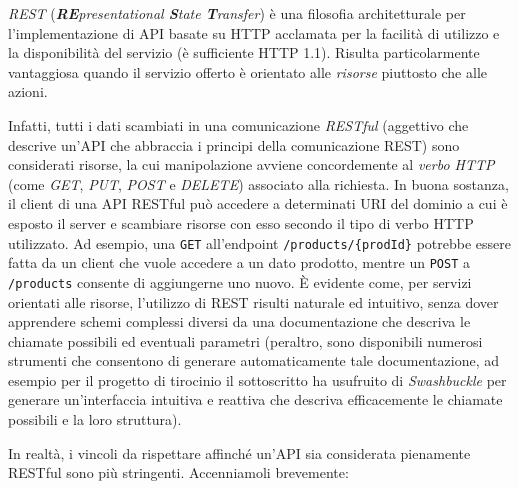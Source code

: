 \emph{REST} (\emph{\textbf{RE}presentational \textbf{S}tate \textbf{T}ransfer}) è una filosofia architetturale per l'implementazione di API basate su HTTP acclamata per la facilità di utilizzo e la disponibilità del servizio (è sufficiente HTTP 1.1). Risulta particolarmente vantaggiosa quando il servizio offerto è orientato alle \emph{risorse} piuttosto che alle azioni.

Infatti, tutti i dati scambiati in una comunicazione \emph{RESTful} (aggettivo che descrive un'API che abbraccia i principi della comunicazione REST) sono considerati risorse, la cui manipolazione avviene concordemente al \emph{verbo HTTP} (come \emph{GET}, \emph{PUT}, \emph{POST} e \emph{DELETE}) associato alla richiesta.
In buona sostanza, il client di una API RESTful può accedere a determinati URI del dominio a cui è esposto il server e scambiare risorse con esso secondo il tipo di verbo HTTP utilizzato. Ad esempio, una \texttt{GET} all'endpoint \texttt{/products/\{prodId\}} potrebbe essere fatta da un client che vuole accedere a un dato prodotto, mentre un \texttt{POST} a \texttt{/products} consente di aggiungerne uno nuovo. È evidente come, per servizi orientati alle risorse, l'utilizzo di REST risulti naturale ed intuitivo, senza dover apprendere schemi complessi diversi da una documentazione che descriva le chiamate possibili ed eventuali parametri (peraltro, sono disponibili numerosi strumenti che consentono di generare automaticamente tale documentazione, ad esempio per il progetto di tirocinio il sottoscritto ha usufruito di \emph{Swashbuckle} per generare un'interfaccia intuitiva e reattiva che descriva efficacemente le chiamate possibili e la loro struttura).

In realtà, i vincoli da rispettare affinché un'API sia considerata pienamente RESTful sono più stringenti. Accenniamoli brevemente:


